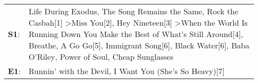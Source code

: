 \begin{supertabular}{p{0.03\textwidth}p{0.92\textwidth}}
 \textbf{S1}:  &  Life During Exodus\textsuperscript{}, \enspace The Song Remains the Same\textsuperscript{}, \enspace Rock the Casbah[1]\textsuperscript{} \textgreater \enspace Miss You[2]\textsuperscript{}, \enspace Hey Nineteen[3]\textsuperscript{} \textgreater \enspace When the World Is Running Down You Make the Best of What's Still Around[4]\textsuperscript{}, \enspace Breathe\textsuperscript{}, \enspace A Go Go[5]\textsuperscript{}, \enspace Immigrant Song[6]\textsuperscript{}, \enspace Black Water[6]\textsuperscript{}, \enspace Baba O'Riley\textsuperscript{}, \enspace Power of Soul\textsuperscript{}, \enspace Cheap Sunglasses\textsuperscript{}  \enspace  \\
 \textbf{E1}:  &                                                                                                                                                                                                                                                                                                                                                                                                                                                                                                                                                               Runnin' with the Devil\textsuperscript{}, \enspace I Want You (She's So Heavy)[7]\textsuperscript{}  \enspace  \\
\end{supertabular}
